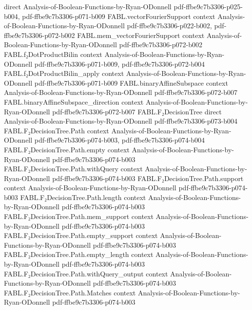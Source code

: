 \begin{theorem}
  {direct}
  {Analysis-of-Boolean-Functions-by-Ryan-ODonnell}
  {pdf-ffbe9c7b3306-p025-b004,
    pdf-ffbe9c7b3306-p071-b009}
\proofstep
  {FABL.vectorFourierSupport}
  {context}
  {Analysis-of-Boolean-Functions-by-Ryan-ODonnell}
  {pdf-ffbe9c7b3306-p022-b002,
    pdf-ffbe9c7b3306-p072-b002}
\proofstep
  {FABL.mem_vectorFourierSupport}
  {context}
  {Analysis-of-Boolean-Functions-by-Ryan-ODonnell}
  {pdf-ffbe9c7b3306-p072-b002}
\proofstep
  {FABL.f₂DotProductBilin}
  {context}
  {Analysis-of-Boolean-Functions-by-Ryan-ODonnell}
  {pdf-ffbe9c7b3306-p071-b009,
    pdf-ffbe9c7b3306-p072-b004}
\proofstep
  {FABL.f₂DotProductBilin_apply}
  {context}
  {Analysis-of-Boolean-Functions-by-Ryan-ODonnell}
  {pdf-ffbe9c7b3306-p071-b009}
\proofstep
  {FABL.binaryAffineSubspace}
  {context}
  {Analysis-of-Boolean-Functions-by-Ryan-ODonnell}
  {pdf-ffbe9c7b3306-p072-b007}
\proofstep
  {FABL.binaryAffineSubspace_direction}
  {context}
  {Analysis-of-Boolean-Functions-by-Ryan-ODonnell}
  {pdf-ffbe9c7b3306-p072-b007}
\proofstep
  {FABL.F₂DecisionTree}
  {direct}
  {Analysis-of-Boolean-Functions-by-Ryan-ODonnell}
  {pdf-ffbe9c7b3306-p073-b004}
\proofstep
  {FABL.F₂DecisionTree.Path}
  {context}
  {Analysis-of-Boolean-Functions-by-Ryan-ODonnell}
  {pdf-ffbe9c7b3306-p074-b003,
    pdf-ffbe9c7b3306-p074-b004}
\proofstep
  {FABL.F₂DecisionTree.Path.empty}
  {context}
  {Analysis-of-Boolean-Functions-by-Ryan-ODonnell}
  {pdf-ffbe9c7b3306-p074-b003}
\proofstep
  {FABL.F₂DecisionTree.Path.withQuery}
  {context}
  {Analysis-of-Boolean-Functions-by-Ryan-ODonnell}
  {pdf-ffbe9c7b3306-p074-b003}
\proofstep
  {FABL.F₂DecisionTree.Path.support}
  {context}
  {Analysis-of-Boolean-Functions-by-Ryan-ODonnell}
  {pdf-ffbe9c7b3306-p074-b003}
\proofstep
  {FABL.F₂DecisionTree.Path.length}
  {context}
  {Analysis-of-Boolean-Functions-by-Ryan-ODonnell}
  {pdf-ffbe9c7b3306-p074-b003}
\proofstep
  {FABL.F₂DecisionTree.Path.mem_support}
  {context}
  {Analysis-of-Boolean-Functions-by-Ryan-ODonnell}
  {pdf-ffbe9c7b3306-p074-b003}
\proofstep
  {FABL.F₂DecisionTree.Path.empty_support}
  {context}
  {Analysis-of-Boolean-Functions-by-Ryan-ODonnell}
  {pdf-ffbe9c7b3306-p074-b003}
\proofstep
  {FABL.F₂DecisionTree.Path.empty_length}
  {context}
  {Analysis-of-Boolean-Functions-by-Ryan-ODonnell}
  {pdf-ffbe9c7b3306-p074-b003}
\proofstep
  {FABL.F₂DecisionTree.Path.withQuery_output}
  {context}
  {Analysis-of-Boolean-Functions-by-Ryan-ODonnell}
  {pdf-ffbe9c7b3306-p074-b003}
\proofstep
  {FABL.F₂DecisionTree.Path.Matches}
  {context}
  {Analysis-of-Boolean-Functions-by-Ryan-ODonnell}
  {pdf-ffbe9c7b3306-p074-b003}

\end{theorem}
